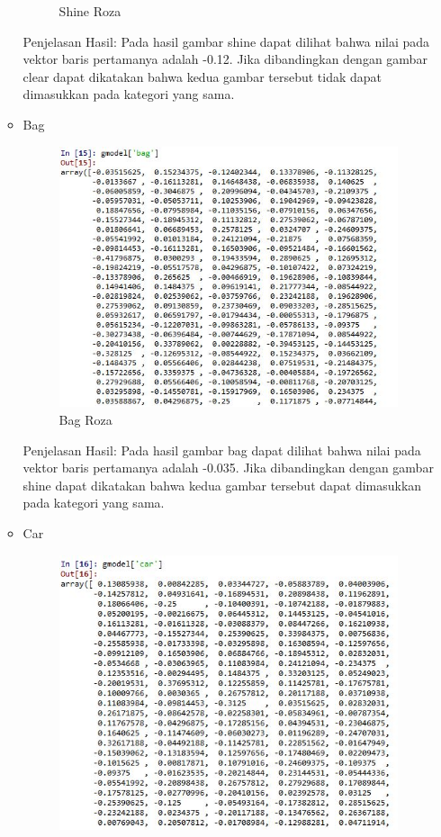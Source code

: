 \begin{enumerate}
\begin{itemize}
\begin{figure}[!hbtp]
\caption{Shine Roza}
\label{text-fadila}
\end{figure}
\par Penjelasan Hasil: Pada hasil gambar shine dapat dilihat bahwa nilai pada vektor baris pertamanya adalah -0.12. Jika dibandingkan dengan gambar clear dapat dikatakan bahwa kedua gambar tersebut tidak dapat dimasukkan pada kategori yang sama.
\item Bag
\begin{figure}[!hbtp]
\centering
\includegraphics[scale=0.6]{figures/bagroza.jpg}
\caption{Bag Roza}
\label{text-fadila}
\end{figure}
\par Penjelasan Hasil: Pada hasil gambar bag dapat dilihat bahwa nilai pada vektor baris pertamanya adalah -0.035. Jika dibandingkan dengan gambar shine dapat dikatakan bahwa kedua gambar tersebut  dapat dimasukkan pada kategori yang sama.
\item Car
\begin{figure}[!hbtp]
\centering
\includegraphics[scale=0.6]{figures/carroza.jpg}

\end{figure}
\end{itemize}
\end{enumerate}
